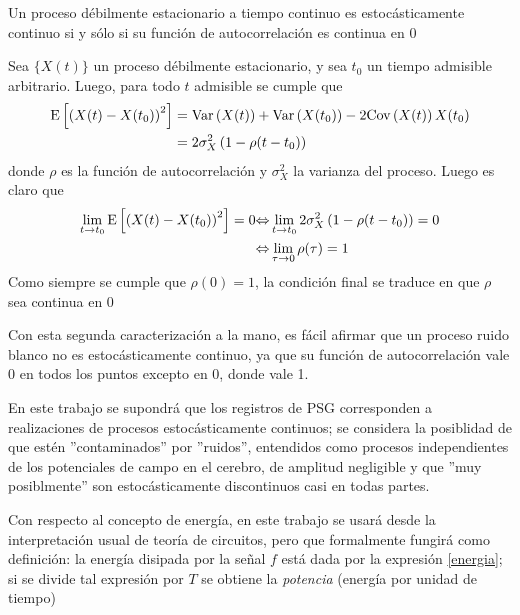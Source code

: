 \begin{thrm}
Un proceso d\'ebilmente estacionario a tiempo continuo es estoc\'asticamente continuo si y s\'olo si
su funci\'on de autocorrelaci\'on es continua en 0
\end{thrm}
\begin{demostracion}
Sea $\{ X(t) \}$ un proceso d\'ebilmente estacionario, y sea $t_0$ un tiempo admisible arbitrario. 
Luego, para todo $t$ admisible se cumple que
\begin{align*}
\mathrm{E}\left[ \left( X(t) - X(t_0) \right)^{2} \right]
&= \mathrm{Var}\left( X(t) \right) + \mathrm{Var}\left( X(t_0) \right) - 2 \mathrm{Cov}\left( X(t) \right){X(t_0)}
\\
&= 2 \sigma_X^{2} \left( 1 - \rho(t-t_0) \right)
\end{align*}
donde $\rho$ es la funci\'on de autocorrelaci\'on y $\sigma_X^{2}$ la varianza del proceso. 
Luego es claro que
\begin{align*}
\lim_{t\rightarrow t_0} \mathrm{E}\left[ \left( X(t) - X(t_0) \right)^{2} \right] = 0  
&{\Leftrightarrow}
\lim_{t\rightarrow t_0} 2 \sigma_X^{2} \left( 1 - \rho(t-t_0) \right) = 0
\\
&{\Leftrightarrow}
\lim_{\tau \rightarrow 0} \rho(\tau) = 1
\end{align*}
Como siempre se cumple que $\rho(0)=1$, la condici\'on final se traduce en que $\rho$ sea continua 
en 0
\end{demostracion}

Con esta segunda caracterizaci\'on a la mano, es f\'acil afirmar que un proceso %
ruido blanco
no es estoc\'asticamente continuo,
ya que su funci\'on de autocorrelaci\'on vale 0 en todos los puntos
excepto en 0, donde vale 1.

En este trabajo se supondr\'a que los registros de PSG corresponden a realizaciones
de procesos estoc\'asticamente continuos; se considera la posiblidad de que est\'en
''contaminados'' por ''ruidos'', entendidos como procesos independientes de los potenciales de 
campo 
en el cerebro, de amplitud negligible y que ''muy posiblmente'' son estoc\'asticamente discontinuos 
casi en todas partes.


Con respecto al concepto de energ\'ia, en este trabajo se usar\'a 
desde la interpretaci\'on usual de teor\'ia de circuitos, pero que formalmente fungir\'a 
como definici\'on:
la energ\'ia disipada por la se\~nal $f$ 
est\'a dada por la expresi\'on \ref{energia}; si se divide tal expresi\'on
por $T$ se obtiene la \textit{potencia} (energ\'ia por unidad de tiempo)

